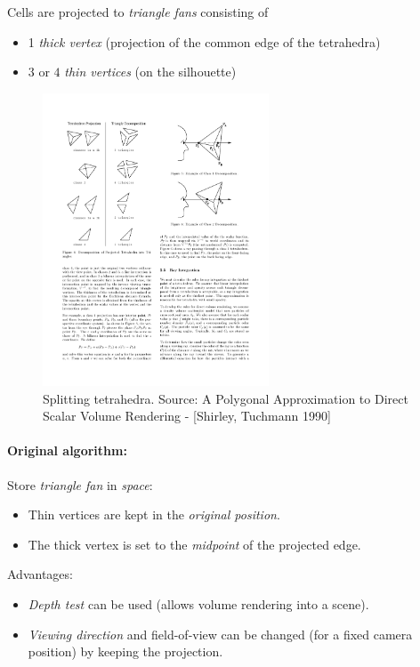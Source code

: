 Cells are projected to \emph{triangle fans} consisting of
\begin{itemize}
    \item 1 \emph{thick vertex} (projection of the common edge of the tetrahedra)
    \item $3$ or $4$ \emph{thin vertices} (on the silhouette)
\end{itemize}
\begin{figure}[H]
    \centering
    \includegraphics[width=0.6\textwidth]{img/04_cell_based_tetrahedra}
    \caption{Splitting tetrahedra. Source: A Polygonal Approximation to Direct Scalar Volume Rendering - [Shirley, Tuchmann 1990]}
\end{figure}

\paragraph{Original algorithm:} Store \emph{triangle fan} in \emph{space}:
\begin{itemize}
    \item Thin vertices are kept in the \emph{original position}.
    \item The thick vertex is set to the \emph{midpoint} of the projected edge.
\end{itemize}
Advantages:
\begin{itemize}
    \item \emph{Depth test} can be used (allows volume rendering into a scene).
    \item \emph{Viewing direction} and {field-of-view} can be changed (for a fixed camera position) by keeping the projection.
\end{itemize}

